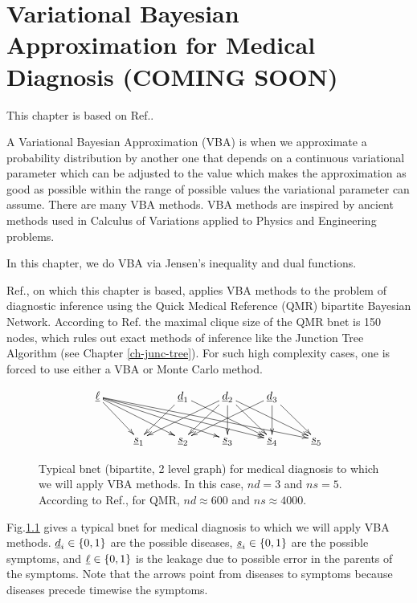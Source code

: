 \chapter{Variational Bayesian Approximation
for Medical Diagnosis (COMING SOON)}
\label{ch-var-bay-medical}

This chapter is based
on Ref.\cite{jaak-jordan}.

A Variational Bayesian Approximation (VBA)
is when we approximate
a probability distribution
by another one that depends
on a continuous variational parameter which can
be adjusted to the value which
makes the approximation
as good as possible
within the range of possible values
the variational parameter
can assume.
There are many VBA methods.
VBA methods are inspired by 
ancient  methods
used in Calculus 
of Variations applied to Physics
and Engineering problems.

In this chapter,
we do VBA  via
Jensen's inequality and
dual functions.

Ref.\cite{jaak-jordan}, on which
this chapter is based,
applies VBA methods to the problem of diagnostic inference using the Quick Medical Reference (QMR) bipartite Bayesian Network. 
According to Ref.\cite{jaak-jordan} 
the maximal clique size of the QMR 
bnet is
150 nodes, which rules out exact methods
of inference like the Junction Tree Algorithm
(see Chapter \ref{ch-junc-tree}).
For such high complexity cases,
one is forced to use
either a VBA or Monte Carlo method.

\begin{figure}[h!]
$$\xymatrix{
\ul{\ell}
\ar[dr]\ar[drr]\ar[drrr]\ar[drrrr]\ar[drrrrr]
&
&\rvd_1\ar[dl]\ar[drr]
&\rvd_2\ar[dll]\ar[dl]\ar[dr]\ar[d]\ar[drr]
&\rvd_3\ar[dll]\ar[d]\ar[dr]
\\
&\rvs_1
&\rvs_2
&\rvs_3
&\rvs_4
&\rvs_5
}$$
\caption{
Typical bnet (bipartite, 2 level graph) 
for medical diagnosis
to which we will apply VBA
methods.
In this case, $nd=3$ and
$ns=5$. 
According to Ref.\cite{jaak-jordan},
for QMR, $nd\approx 600$ 
and $ns\approx 4000$.
}
\label{fig-var-bay-med-bnet}
\end{figure}

Fig.\ref{fig-var-bay-med-bnet}
gives a typical bnet
for medical diagnosis
to which we will apply VBA methods.
${\underline{d}}_i\in \{0,1\}$
are the possible diseases,
${\underline{s}}_i\in\{0,1\}$ are the possible
symptoms, and $\underline{\ell}\in\{0,1\}$
is the leakage  due to 
possible error in 
the parents of the symptoms.
Note that the 
arrows point from
diseases to symptoms
because diseases precede
timewise
the symptoms.

